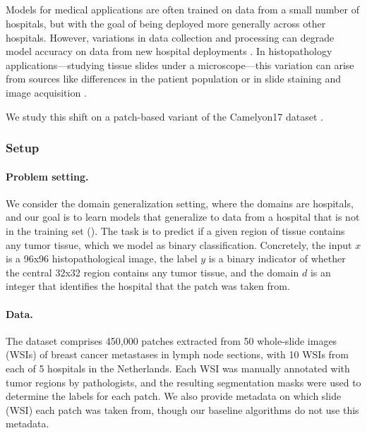 \subsection{\Camelyon}\label{sec:app_camelyon}
Models for medical applications are often trained on data from a small number of hospitals, but with the goal of being deployed more generally across other hospitals.
However, variations in data collection and processing can degrade model accuracy on data from new hospital deployments \citep{zech2018radio,albadawy2018tumor}.
In histopathology applications---studying tissue slides under a microscope---this variation can arise from sources like differences in the patient population or in slide staining and image acquisition \citep{veta2016mitosis,komura2018machine,tellez2019quantifying}.

We study this shift on a patch-based variant of the Camelyon17 dataset \citep{bandi2018detection}.

\subsubsection{Setup}
\paragraph{Problem setting.}
We consider the domain generalization setting, where the domains are hospitals, and our goal is to learn models that generalize to data from a hospital that is not in the training set ().
The task is to predict if a given region of tissue contains any tumor tissue,
which we model as binary classification.
Concretely, the input $x$ is a 96x96 histopathological image, the label $y$ is a binary indicator of whether the central 32x32 region contains any tumor tissue, and the domain $d$ is an integer that identifies the hospital that the patch was taken from.

\paragraph{Data.}
The dataset comprises 450,000 patches extracted from 50 whole-slide images (WSIs) of breast cancer metastases in lymph node sections, with 10 WSIs from each of 5 hospitals in the Netherlands.
Each WSI was manually annotated with tumor regions by pathologists, and the resulting segmentation masks were used to determine the labels for each patch.
We also provide metadata on which slide (WSI) each patch was taken from, though our baseline algorithms do not use this metadata.

